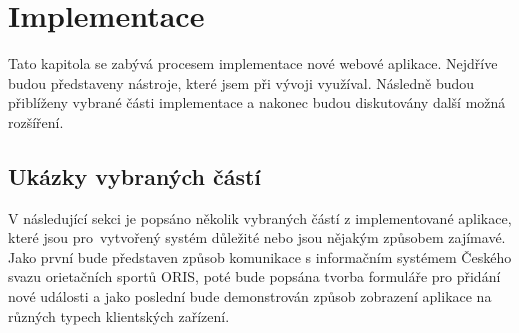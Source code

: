 \chapter{Implementace}
Tato kapitola se zabývá procesem implementace nové webové aplikace. Nejdříve budou představeny nástroje, které jsem při vývoji využíval. Následně budou přiblíženy vybrané části implementace a nakonec budou diskutovány další možná rozšíření.



\section{Ukázky vybraných částí}
V následující sekci je popsáno několik vybraných částí z implementované aplikace, které jsou pro~vytvořený systém důležité nebo jsou nějakým způsobem zajímavé. Jako první bude představen způsob komunikace s informačním systémem Českého svazu orietačních sportů ORIS, poté bude popsána tvorba formuláře pro přidání nové události a jako poslední bude demonstrován způsob zobrazení aplikace na různých typech klientských zařízení.
\newpage



\newpage

